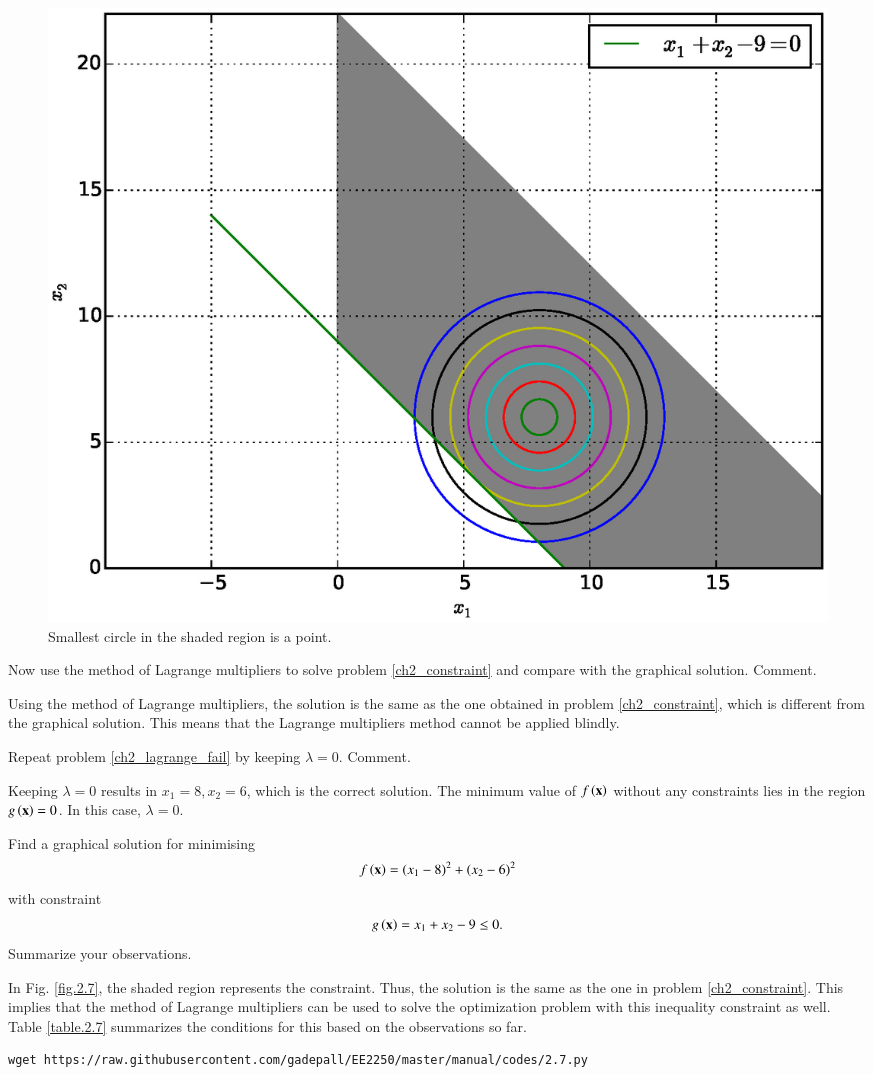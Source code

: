 \documentclass[journal,12pt,twocolumn]{IEEEtran}
\begin{document}
%
\begin{figure}[h]
\centering
\includegraphics[width=\columnwidth]{./figs/2.4.eps}
\caption{ Smallest circle in the shaded region is a point.}
\label{fig.2.4}	
\end{figure}
%
\begin{problem}
\label{ch2_lagrange_fail}
Now use the method of Lagrange multipliers to solve  problem \ref{ch2_constraint} and compare with the graphical solution.  Comment.
\end{problem}
%
\solution Using the method of Lagrange multipliers, the solution is the same as the one obtained in  problem \ref{ch2_constraint}, which is different from the graphical solution.  This means that the Lagrange multipliers method cannot be applied blindly.
\begin{problem}
Repeat problem \ref{ch2_lagrange_fail} by keeping 
 $\lambda=0$.   Comment.
\end{problem}
\solution Keeping $\lambda = 0$ results in $x_1 = 8, x_2 = 6$, which is the correct solution.  The minimum value of $f\left(\mathbf{x}\right)$ without any constraints lies in the region $g\left(\mathbf{x}\right) = 0$.  In this case, $\lambda = 0$.  
%
%
\begin{problem}
\label{ch2_constraint_border}
Find a graphical solution for minimising
\begin{align}
f\left(\mathbf{x}\right) = (x_1-8)^2 + (x_2-6)^2
\end{align}
with constraint
\begin{align}
\label{convex-constraint}
g\left(\mathbf{x}\right) = x_1 + x_2 - 9 \leq 0.
\end{align}
Summarize your observations.
\end{problem}
%
\solution In Fig. \ref{fig.2.7}, the shaded region represents the constraint.  Thus, the solution is the same as the one in problem \ref{ch2_constraint}. This implies that the method of
Lagrange multipliers can be used to solve the optimization problem with this inequality constraint as well.  Table \ref{table.2.7} summarizes the conditions for this based on the observations so far.
\begin{lstlisting}
wget https://raw.githubusercontent.com/gadepall/EE2250/master/manual/codes/2.7.py
\end{lstlisting}
\end{document}
